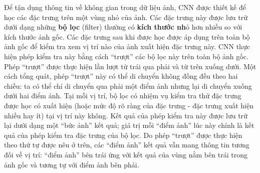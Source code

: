 	Để tận dụng thông tin về không gian trong dữ liệu ảnh, CNN được thiết kế để học các đặc trưng trên một vùng nhỏ của ảnh.
	Các đặc trưng này được lưu trữ dưới dạng những \textbf{bộ lọc} (filter) thường có \textbf{kích thước nh}ỏ hơn nhiều so với kích thước ảnh gốc.
	Các đặc trưng sau khi được học được áp dụng trên toàn bộ ảnh gốc để kiểm tra xem vị trí nào của ảnh xuất hiện đặc trưng này.
	CNN thực hiện phép kiểm tra này bằng cách ``trượt'' các bộ lọc này trên toàn bộ ảnh gốc.
	Phép ``trượt'' được thực hiện lần lượt từ trái qua phải và từ trên xuống dưới.
	Một cách tổng quát, phép ``trượt'' này có thể di chuyển không đồng đều theo hai chiều: ta có thể chỉ di chuyển qua phải một điểm ảnh nhưng lại di chuyển xuống dưới hai điểm ảnh.
	Tại mỗi vị trí, bộ lọc có nhiệm vụ kiểm tra thử đặc trưng được học có xuất hiện (hoặc mức độ rõ ràng của đặc trưng - đặc trưng xuất hiện nhiều hay ít) tại vị trí này không.
	Kết quả của phép kiểm tra này được lưu trữ lại dưới dạng một ``bức ảnh'' kết quả; giá trị mỗi ``điểm ảnh'' lúc này chính là kết quả của phép kiểm tra đặc trưng của bộ lọc.
	Do phép ``trượt'' được thực hiện theo thứ tự được nêu ở trên, các ``điểm ảnh'' kết quả vẫn mang thông tin tương đối về vị trí: ``điểm ảnh'' bên trái ứng với kết quả của vùng nằm bên trái trong ảnh gốc và tương tự với điểm ảnh bên phải.
